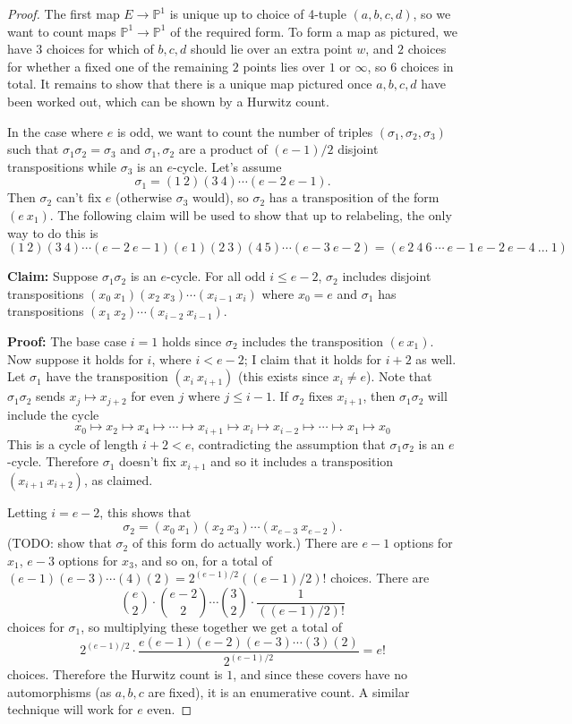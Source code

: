 \documentclass[11pt]{article}           %
\renewcommand{\P}{\mathbb P}
\theoremstyle{definition}
\theoremstyle{definition}
\begin{document}
\begin{proof}

  The first map $E\to\P^1$ is unique up to choice of 4-tuple $(a,b,c,d)$, so we want to count maps $\P^1\to\P^1$ of the required
  form. To form a map as pictured, we have $3$ choices for which of $b,c,d$ should lie
  over an extra point $w$, and $2$ choices for whether a
  fixed one of the remaining $2$ points lies over $1$ or $\infty$,
  so $6$ choices in total. It remains to show that there is a unique map pictured
  once $a,b,c,d$ have been worked out, which can be shown by a Hurwitz count.
  
  In the case where $e$ is odd, we want to count the number of triples $(\sigma_1,\sigma_2,\sigma_3)$
  such that $\sigma_1\sigma_2=\sigma_3$ and $\sigma_1,\sigma_2$ are a product of
  $(e-1)/2$ disjoint transpositions while $\sigma_3$ is an $e$-cycle.
  Let's assume
  \[
  \sigma_1=(1\ 2)(3\ 4)\cdots (e-2\ e-1).
  \]
  Then $\sigma_2$ can't fix $e$ (otherwise $\sigma_3$ would), so $\sigma_2$
  has a transposition of the form $(e\ x_1)$. The following claim will be used to show that up to relabeling, the only way to do this is
  \[
  (1\ 2)(3\ 4)\cdots (e-2\ e-1)(e\ 1)(2\ 3)(4\ 5)\cdots (e-3\ e-2)=(e\ 2\ 4\ 6\ \cdots\ e-1\ e-2\ e-4\ \dots\ 1)
  \]

  {\bf Claim:} Suppose $\sigma_1\sigma_2$ is an $e$-cycle. For all odd $i\leq e-2$,
  $\sigma_2$ includes disjoint transpositions $(x_0\ x_1)(x_2\ x_3)\cdots (x_{i-1}\ x_i)$
  where $x_0=e$ and $\sigma_1$ has transpositions $(x_1\ x_2)\cdots (x_{i-2}\ x_{i-1})$.

  {\bf Proof:} The base case $i=1$ holds since $\sigma_2$ includes the transposition $(e\ x_1)$.
  Now suppose it holds for $i$,
  where $i<e-2$; I claim that it holds for $i+2$ as well. Let $\sigma_1$ have the transposition $(x_i\ x_{i+1})$ (this exists
  since $x_i\neq e$).
  Note that $\sigma_1\sigma_2$ sends
  $x_j\mapsto x_{j+2}$ for even $j$ where $j\leq i-1$. If $\sigma_2$ fixes $x_{i+1}$, then $\sigma_1\sigma_2$ will include the cycle
  \[
  x_0\mapsto x_2\mapsto x_4\mapsto\cdots\mapsto x_{i+1}\mapsto x_i\mapsto x_{i-2}\mapsto\cdots\mapsto x_1\mapsto x_0
  \]
  This is a cycle of length $i+2<e$, contradicting the assumption that $\sigma_1\sigma_2$ is an $e$-cycle. Therefore
  $\sigma_1$ doesn't fix $x_{i+1}$ and so it includes a transposition $(x_{i+1}\ x_{i+2})$, as claimed.

  Letting $i=e-2$, this shows that
  \[
  \sigma_2=(x_0\ x_1)(x_2\ x_3)\cdots (x_{e-3}\ x_{e-2}).
  \]
  (TODO: show that $\sigma_2$ of this form do actually work.) There are $e-1$ options for $x_1$, $e-3$ options for $x_3$, and so on,
  for a total of $(e-1)(e-3)\cdots (4)(2)=2^{(e-1)/2}((e-1)/2)!$ choices.
  There are
  \[
  \binom{e}{2}\cdot\binom{e-2}{2}\cdots\binom{3}{2}\cdot\frac 1{((e-1)/2)!}
  \]
  choices for $\sigma_1$, so multiplying these together we get a total of
  \[
  2^{(e-1)/2}\cdot\frac{e(e-1)(e-2)(e-3)\cdots (3)(2)}{2^{(e-1)/2}}=e!
  \]
  choices. Therefore the Hurwitz count is $1$, and since these covers have no automorphisms (as $a,b,c$ are fixed), it is an enumerative count.
  A similar technique will work for $e$ even.

  \end{proof}
\end{document}
